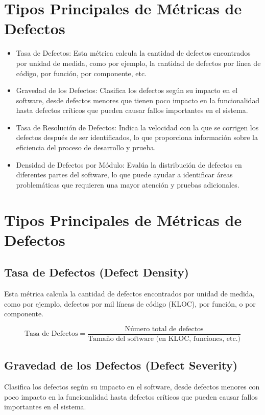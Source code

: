 \documentclass{article}
\begin{document}
\section{Tipos Principales de Métricas de Defectos}

\begin{itemize}
    \item Tasa de Defectos: Esta métrica calcula la cantidad de defectos encontrados por unidad de medida, como por ejemplo, la cantidad de defectos por línea de código, por función, por componente, etc.
    
    \item Gravedad de los Defectos: Clasifica los defectos según su impacto en el software, desde defectos menores que tienen poco impacto en la funcionalidad hasta defectos críticos que pueden causar fallos importantes en el sistema.
    \item Tasa de Resolución de Defectos: Indica la velocidad con la que se corrigen los defectos después de ser identificados, lo que proporciona información sobre la eficiencia del proceso de desarrollo y prueba.
    \item Densidad de Defectos por Módulo: Evalúa la distribución de defectos en diferentes partes del software, lo que puede ayudar a identificar áreas problemáticas que requieren una mayor atención y pruebas adicionales.
\end{itemize}
\section{Tipos Principales de Métricas de Defectos}

\subsection{Tasa de Defectos (Defect Density)}
Esta métrica calcula la cantidad de defectos encontrados por unidad de medida, como por ejemplo, defectos por mil líneas de código (KLOC), por función, o por componente.

\begin{equation}
  \text{Tasa de Defectos} = \frac{\text{Número total de defectos}}{\text{Tamaño del software (en KLOC, funciones, etc.)}}
\end{equation}

\subsection{Gravedad de los Defectos (Defect Severity)}
Clasifica los defectos según su impacto en el software, desde defectos menores con poco impacto en la funcionalidad hasta defectos críticos que pueden causar fallos importantes en el sistema.
\end{document}
